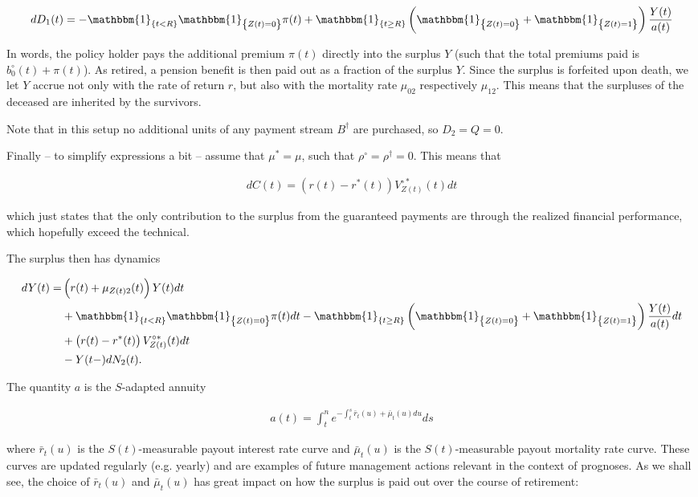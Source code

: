 \documentclass{book}
\newcommand{\1}[1]{\mathbbm{1}_{\left\lbrace #1 \right\rbrace}}
\theoremstyle{break}
\theoremstyle{remark}
\numberwithin{equation}{section}
\begin{document}
\begin{align*}
	dD_1(t) = - \1{t<R} \1{Z(t)=0} \pi(t) + \1{t \geq R} \left( \1{Z(t)=0} + \1{Z(t)=1} \right) \frac{Y(t)}{a(t)}
\end{align*}

In words, the policy holder pays the additional premium $\pi(t)$ directly into the surplus $Y$ (such that the total premiums paid is $b_0^\circ(t)+ \pi(t)$). As retired, a pension benefit is then paid out as a fraction of the surplus $Y$. Since the surplus is forfeited upon death, we let $Y$ accrue not only with the rate of return $r$, but also with the mortality rate $\mu_{02}$ respectively $\mu_{12}$. This means that the surpluses of the deceased are inherited by the survivors.

Note that in this setup no additional units of any payment stream $B^\dagger$ are purchased, so $D_2=Q=0$.

Finally -- to simplify expressions a bit -- assume that $\mu^*=\mu$, such that $\rho^\circ = \rho^\dagger = 0$. This means that

\begin{align*}
	dC(t) = \left( r(t) - r^*(t) \right) V_{Z(t)}^{\circ*}(t) dt
\end{align*}

which just states that the only contribution to the surplus from the guaranteed payments are through the realized financial performance, which hopefully exceed the technical.

The surplus then has dynamics

\begin{align*}
	dY(t) =& \left( r(t) + \mu_{Z(t)2}(t) \right) Y(t) dt \\
	&+ \1{t<R} \1{Z(t)=0} \pi(t) dt - \1{t \geq R} \left( \1{Z(t)=0} + \1{Z(t)=1} \right) \frac{Y(t)}{a(t)} dt \\
	&+ \left( r(t) - r^*(t) \right) V_{Z(t)}^{\circ*}(t) dt \\
	&- Y(t-) dN_2(t).
\end{align*}

The quantity $a$ is the $S$-adapted annuity

\begin{align*}
	a(t) = \int_t^n e^{-\int_t^s \bar{r}_t(u) + \bar{\mu}_t(u) du} ds
\end{align*}

where $\bar{r}_t(u)$ is the $S(t)$-measurable payout interest rate curve and $\bar{\mu}_t(u)$ is the  $S(t)$-measurable payout mortality rate curve. These curves are updated regularly (e.g. yearly) and are examples of future management actions relevant in the context of prognoses. As we shall see, the choice of $\bar{r}_t(u)$ and $\bar{\mu}_t(u)$ has great impact on how the surplus is paid out over the course of retirement:
\end{document}

